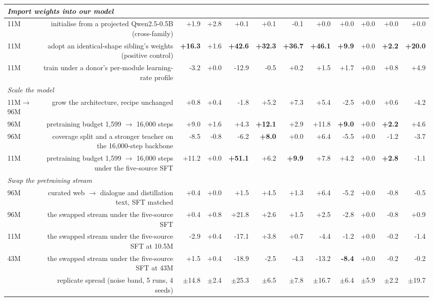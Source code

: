 \documentclass{article}
\begin{document}
\begin{table}[htbp]
{\begin{tabular}{lrrrrrrrrrrr}
\midrule
\multicolumn{12}{l}{\emph{Import weights into our model}} \\
\midrule
11M & initialise from a projected Qwen2.5-0.5B (cross-family) & +1.9 & +2.8 & +0.1 & +0.1 & -0.1 & +0.0 & +0.0 & +0.0 & +0.0 & +0.0 \\
11M & adopt an identical-shape sibling's weights (positive control) & \textbf{+16.3} & +1.6 & \textbf{+42.6} & \textbf{+32.3} & \textbf{+36.7} & \textbf{+46.1} & \textbf{+9.9} & +0.0 & \textbf{+2.2} & \textbf{+20.0} \\
11M & train under a donor's per-module learning-rate profile & -3.2 & +0.0 & -12.9 & -0.5 & +0.2 & +1.5 & +1.7 & +0.0 & +0.8 & +4.9 \\
\midrule
\multicolumn{12}{l}{\emph{Scale the model}} \\
\midrule
11M$\rightarrow$96M & grow the architecture, recipe unchanged & +0.8 & +0.4 & -1.8 & +5.2 & +7.3 & +5.4 & -2.5 & +0.0 & +0.6 & -4.2 \\
96M & pretraining budget 1,599 $\rightarrow$ 16,000 steps & +9.0 & +1.6 & +4.3 & \textbf{+12.1} & +2.9 & +11.8 & \textbf{+9.0} & +0.0 & \textbf{+2.2} & +4.6 \\
96M & coverage split and a stronger teacher on the 16,000-step backbone & -8.5 & -0.8 & -6.2 & \textbf{+8.0} & +0.0 & +6.4 & -5.5 & +0.0 & -1.2 & -3.7 \\
11M & pretraining budget 1,599 $\rightarrow$ 16,000 steps under the five-source SFT & +11.2 & +0.0 & \textbf{+51.1} & +6.2 & \textbf{+9.9} & +7.8 & +4.2 & +0.0 & \textbf{+2.8} & -1.1 \\
\midrule
\multicolumn{12}{l}{\emph{Swap the pretraining stream}} \\
\midrule
96M & curated web $\rightarrow$ dialogue and distillation text, SFT matched & +0.4 & +0.0 & +1.5 & +4.5 & +1.3 & +6.4 & -5.2 & +0.0 & -0.8 & -0.5 \\
96M & the swapped stream under the five-source SFT & +0.4 & +0.8 & +21.8 & +2.6 & +1.5 & +2.5 & -2.8 & +0.0 & -0.8 & +0.9 \\
11M & the swapped stream under the five-source SFT at 10.5M & -2.9 & +0.4 & -17.1 & +3.8 & +0.7 & -4.4 & -1.2 & +0.0 & -0.2 & -1.4 \\
43M & the swapped stream under the five-source SFT at 43M & +1.5 & +0.4 & -18.9 & -2.5 & -4.3 & -13.2 & \textbf{-8.4} & +0.0 & -0.2 & -0.2 \\
 & replicate spread (noise band, 5 runs, 4 seeds) & $\pm$14.8 & $\pm$2.4 & $\pm$25.3 & $\pm$6.5 & $\pm$7.8 & $\pm$16.7 & $\pm$6.4 & $\pm$5.9 & $\pm$2.2 & $\pm$19.7 \\
\bottomrule
\end{tabular}}
\end{table}
\end{document}
